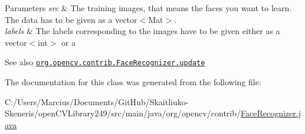 \begin{DoxyParams}{Parameters}
{\em src} & The training images, that means the faces you want to learn. The data has to be given as a {\ttfamily vector$<$\+Mat$>$}. \\
\hline
{\em labels} & The labels corresponding to the images have to be given either as a {\ttfamily vector$<$int$>$} or a\\
\hline
\end{DoxyParams}
\begin{DoxySeeAlso}{See also}
\href{http://docs.opencv.org/modules/contrib/doc/facerec_api.html#facerecognizer-update}{\tt org.\+opencv.\+contrib.\+Face\+Recognizer.\+update} 
\end{DoxySeeAlso}


The documentation for this class was generated from the following file\+:\begin{DoxyCompactItemize}
\item 
C\+:/\+Users/\+Marcius/\+Documents/\+Git\+Hub/\+Skaitliuko-\/\+Skeneris/open\+C\+V\+Library249/src/main/java/org/opencv/contrib/\mbox{\hyperlink{_face_recognizer_8java}{Face\+Recognizer.\+java}}\end{DoxyCompactItemize}

